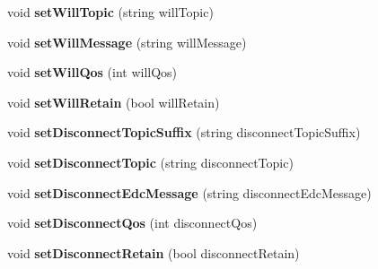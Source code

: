 \begin{DoxyCompactItemize}
\item 
\hypertarget{class_edc_configuration_add5ce13853c320f6ebb6045a3f9f4ec0}{void {\bfseries set\-Will\-Topic} (string will\-Topic)}\label{class_edc_configuration_add5ce13853c320f6ebb6045a3f9f4ec0}

\item 
\hypertarget{class_edc_configuration_a7821ee940cb9712b044ab9930020d80a}{void {\bfseries set\-Will\-Message} (string will\-Message)}\label{class_edc_configuration_a7821ee940cb9712b044ab9930020d80a}

\item 
\hypertarget{class_edc_configuration_a3600dcf9ef579615561b6b57b763b149}{void {\bfseries set\-Will\-Qos} (int will\-Qos)}\label{class_edc_configuration_a3600dcf9ef579615561b6b57b763b149}

\item 
\hypertarget{class_edc_configuration_a38db0eec68d5ae6d8658b9f1b5db8512}{void {\bfseries set\-Will\-Retain} (bool will\-Retain)}\label{class_edc_configuration_a38db0eec68d5ae6d8658b9f1b5db8512}

\item 
\hypertarget{class_edc_configuration_a825c3ff2a1348f621acf05b67ddbdb1a}{void {\bfseries set\-Disconnect\-Topic\-Suffix} (string disconnect\-Topic\-Suffix)}\label{class_edc_configuration_a825c3ff2a1348f621acf05b67ddbdb1a}

\item 
\hypertarget{class_edc_configuration_ac7017c46312878b4ae528e560dadf7b7}{void {\bfseries set\-Disconnect\-Topic} (string disconnect\-Topic)}\label{class_edc_configuration_ac7017c46312878b4ae528e560dadf7b7}

\item 
\hypertarget{class_edc_configuration_a7a9c77c2d2fcceede8bcb2713241acf5}{void {\bfseries set\-Disconnect\-Edc\-Message} (string disconnect\-Edc\-Message)}\label{class_edc_configuration_a7a9c77c2d2fcceede8bcb2713241acf5}

\item 
\hypertarget{class_edc_configuration_a9e6fe42678ea83eccd297a1c36b7ab17}{void {\bfseries set\-Disconnect\-Qos} (int disconnect\-Qos)}\label{class_edc_configuration_a9e6fe42678ea83eccd297a1c36b7ab17}

\item 
\hypertarget{class_edc_configuration_a241f297ef43e0a2c4bb1a7fd20133390}{void {\bfseries set\-Disconnect\-Retain} (bool disconnect\-Retain)}\label{class_edc_configuration_a241f297ef43e0a2c4bb1a7fd20133390}


\end{DoxyCompactItemize}
